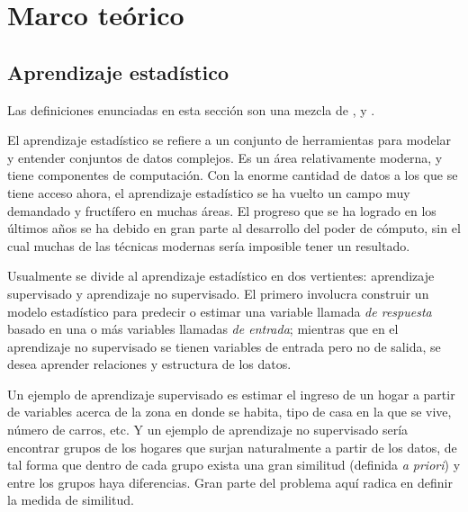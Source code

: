 
\chapter{Marco teórico}


\section{Aprendizaje estadístico}

Las definiciones enunciadas en esta sección son una mezcla de \cite{christopher2006pattern}, \cite{friedman2001elements} y \cite{james2013introduction}.

El aprendizaje estadístico se refiere a un conjunto de herramientas para modelar y entender conjuntos de datos complejos. Es un área relativamente moderna, y tiene componentes de computación. Con la enorme cantidad de datos a los que se tiene acceso ahora, el aprendizaje estadístico se ha vuelto un campo muy demandado y fructífero en muchas áreas. El progreso que se ha logrado en los últimos años se ha debido en gran parte al desarrollo del poder de cómputo, sin el cual muchas de las técnicas modernas sería imposible tener un resultado.

Usualmente se divide al aprendizaje estadístico en dos vertientes: aprendizaje supervisado y aprendizaje no supervisado. El primero involucra construir un modelo estadístico para predecir o estimar una variable llamada \textit{de respuesta} basado en una o más variables llamadas \textit{de entrada}; mientras que en el aprendizaje no supervisado se tienen variables de entrada pero no de salida, se desea aprender relaciones y estructura de los datos.

Un ejemplo de aprendizaje supervisado es estimar el ingreso de un hogar a partir de variables acerca de la zona en donde se habita, tipo de casa en la que se vive, número de carros, etc. Y un ejemplo de aprendizaje no supervisado sería encontrar grupos de los hogares que surjan naturalmente a partir de los datos, de tal forma que dentro de cada grupo exista una gran similitud (definida \textit{a priori}) y entre los grupos haya diferencias. Gran parte del problema aquí radica en definir la medida de similitud.

